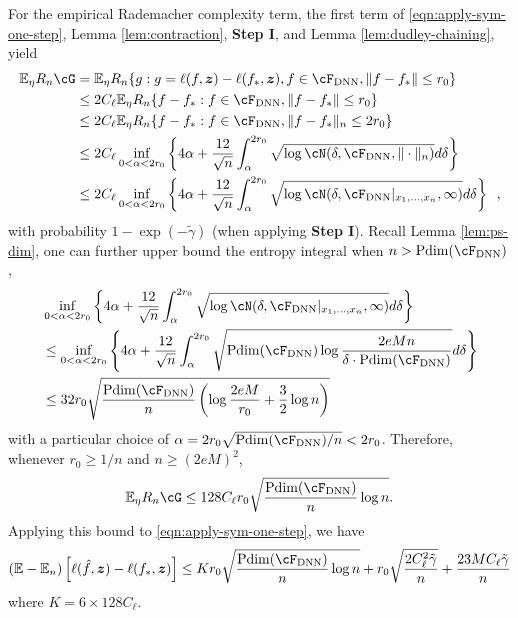 \documentclass[11pt]{article}
\numberwithin{equation}{section}
\theoremstyle{definition}
\newcommand{\E}{\mathbb{E}}
\newcommand{\bz}{\bm{z}}
\newcommand{\gt}{\tilde{\gamma}}
\begin{document}
\begin{appendices}
For the empirical Rademacher complexity term, the first term of \eqref{eqn:apply-sym-one-step}, Lemma \ref{lem:contraction}, {\bf Step I}, and Lemma \ref{lem:dudley-chaining}, yield
\begin{align*}
	 \E_\eta R_n \cG &=\E_\eta R_n \{g : g = \ell(f, \bz) - \ell(f_*, \bz), f \in \cF_{\rm DNN}, \| f -f_* \| \leq r_0\} \\
	& \leq 2 C_\ell \E_\eta R_n \{f - f_* :  f \in \cF_{\rm DNN}, \| f -f_* \| \leq r_0 \} \\
	& \leq 2 C_\ell \E_\eta R_n \{f - f_* :  f \in \cF_{\rm DNN}, \| f -f_* \|_n \leq 2 r_0 \} \\
	& \leq 2 C_\ell \inf_{0 < \alpha < 2r_0} \left\{ 4 \alpha + \frac{12}{\sqrt{n}} \int_\alpha^{2r_0} \sqrt{\log \cN(\delta, \cF_{\rm DNN}, \| \cdot\|_n) } d\delta  \right\}     \\
	& \leq 2 C_\ell \inf_{0 < \alpha < 2r_0} \left\{ 4 \alpha + \frac{12}{\sqrt{n}} \int_\alpha^{2 r_0} \sqrt{\log \cN(\delta, \cF_{\rm DNN}|_{x_1, \ldots, x_n}, \infty)  } d\delta  \right\} \enspace,
\end{align*}
with probability $1 - \exp(-\gt)$ (when applying {\bf Step I}). Recall Lemma \ref{lem:ps-dim}, one can further upper bound the entropy integral when $n > {\rm Pdim}(\cF_{\rm DNN})$,
\begin{align*}
	& \inf_{0 < \alpha < 2r_0} \left\{ 4 \alpha + \frac{12}{\sqrt{n}} \int_\alpha^{2 r_0} \sqrt{\log \cN(\delta, \cF_{\rm DNN}|_{x_1, \ldots, x_n}, \infty)  } d\delta  \right\} \nonumber \\
	& \leq \inf_{0 < \alpha < 2r_0} \left\{ 4 \alpha + \frac{12}{\sqrt{n}} \int_\alpha^{2 r_0} \sqrt{ {\rm Pdim}(\cF_{\rm DNN}) \log \frac{2eM n}{\delta \cdot {\rm Pdim}(\cF_{\rm DNN})}  } d\delta  \right\} \nonumber \\
	& \leq 32 r_0 \sqrt{\frac{{\rm Pdim}(\cF_{\rm DNN})}{n} \left( \log \frac{2eM}{r_0} + \frac{3}{2} \log n \right) } \label{eqn:chaining-bd}
\end{align*}
with a particular choice of $\alpha = 2r_0 \sqrt{{\rm Pdim}(\cF_{\rm DNN}) / n} < 2r_0$. Therefore, whenever $r_0 \geq 1/n$ and $n \geq (2eM)^2$, 
\[
	 \E_\eta R_n \cG  \leq  128 C_\ell r_0  \sqrt{ \frac{{\rm Pdim}(\cF_{\rm DNN}) }{n}  \log n}.
\]
Applying this bound to \eqref{eqn:apply-sym-one-step}, we have
\begin{equation}
	\label{eqn:emp-term}
	\left( \E - \E_n \right)\left[ \ell(\hat{f}, \bz) - \ell(f_*, \bz) \right]
	\leq K r_0  \sqrt{ \frac{{\rm Pdim}(\cF_{\rm DNN})}{n} \log n} + r_0 \sqrt{\frac{2 C_\ell^2 \gt}{n}} + \frac{23 M C_\ell \gt}{n}  
\end{equation}
where $K = 6\times128C_\ell$.



\end{appendices}
\end{document}
